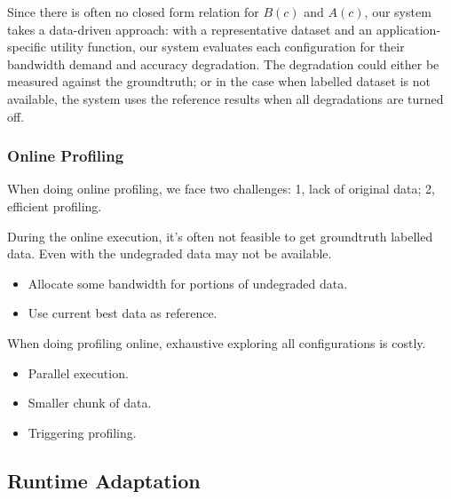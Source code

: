 Since there is often no closed form relation for $B(c)$ and $A(c)$, our system
takes a data-driven approach: with a representative dataset and an
application-specific utility function, our system evaluates each configuration
for their bandwidth demand and accuracy degradation. The degradation could
either be measured against the groundtruth; or in the case when labelled dataset
is not available, the system uses the reference results when all degradations
are turned off.


\subsubsection{Online Profiling}
\label{sec:online-profiling}

When doing online profiling, we face two challenges: 1, lack of original data;
2, efficient profiling.

 During the online execution,
it's often not feasible to get groundtruth labelled data. Even with the
undegraded data may not be available.

\begin{itemize}[leftmargin=16pt]
\item Allocate some bandwidth for portions of undegraded data.
\item Use current best data as reference.
\end{itemize}

 When doing profiling online, exhaustive exploring
all configurations is costly.

\begin{itemize}[leftmargin=16pt]
\item Parallel execution.
\item Smaller chunk of data.
\item Triggering profiling.
\end{itemize}

\subsection{Runtime Adaptation}
\label{sec:adaptation}

